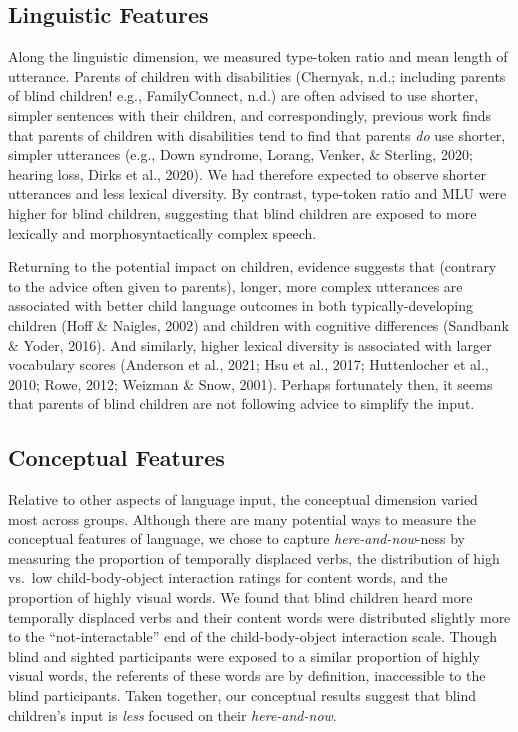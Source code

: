 \documentclass[
  man,floatsintext]{apa6}
\begin{document}
\hypertarget{linguistic-features-2}{%
\subsection{Linguistic Features}\label{linguistic-features-2}}

Along the linguistic dimension, we measured type-token ratio and mean length of utterance. Parents of children with disabilities (Chernyak, n.d.; including parents of blind children! e.g., FamilyConnect, n.d.) are often advised to use shorter, simpler sentences with their children, and correspondingly, previous work finds that parents of children with disabilities tend to find that parents \emph{do} use shorter, simpler utterances (e.g., Down syndrome, Lorang, Venker, \& Sterling, 2020; hearing loss, Dirks et al., 2020). We had therefore expected to observe shorter utterances and less lexical diversity. By contrast, type-token ratio and MLU were higher for blind children, suggesting that blind children are exposed to more lexically and morphosyntactically complex speech.

Returning to the potential impact on children, evidence suggests that (contrary to the advice often given to parents), longer, more complex utterances are associated with better child language outcomes in both typically-developing children (Hoff \& Naigles, 2002) and children with cognitive differences (Sandbank \& Yoder, 2016). And similarly, higher lexical diversity is associated with larger vocabulary scores (Anderson et al., 2021; Hsu et al., 2017; Huttenlocher et al., 2010; Rowe, 2012; Weizman \& Snow, 2001). Perhaps fortunately then, it seems that parents of blind children are not following advice to simplify the input.

\hypertarget{conceptual-features-2}{%
\subsection{Conceptual Features}\label{conceptual-features-2}}

Relative to other aspects of language input, the conceptual dimension varied most across groups. Although there are many potential ways to measure the conceptual features of language, we chose to capture \emph{here-and-now}-ness by measuring the proportion of temporally displaced verbs, the distribution of high vs.~low child-body-object interaction ratings for content words, and the proportion of highly visual words. We found that blind children heard more temporally displaced verbs and their content words were distributed slightly more to the ``not-interactable'' end of the child-body-object interaction scale. Though blind and sighted participants were exposed to a similar proportion of highly visual words, the referents of these words are by definition, inaccessible to the blind participants. Taken together, our conceptual results suggest that blind children's input is \emph{less} focused on their \emph{here-and-now}.
\end{document}
